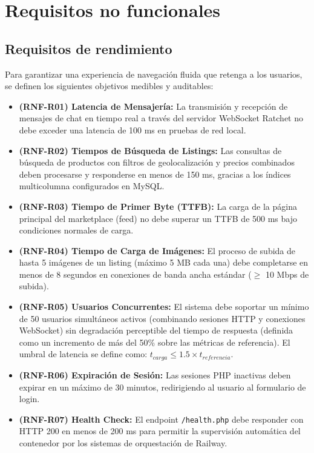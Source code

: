 \documentclass[11pt,a4paper]{report}
\begin{document}
\newpage
\section{Requisitos no funcionales}

\subsection{Requisitos de rendimiento}
Para garantizar una experiencia de navegación fluida que retenga a los usuarios, se definen los siguientes objetivos medibles y auditables:
\begin{itemize}
    \item \textbf{(RNF-R01) Latencia de Mensajería:} La transmisión y recepción de mensajes de chat en tiempo real a través del servidor WebSocket Ratchet no debe exceder una latencia de 100 ms en pruebas de red local.
    \item \textbf{(RNF-R02) Tiempos de Búsqueda de Listings:} Las consultas de búsqueda de productos con filtros de geolocalización y precios combinados deben procesarse y responderse en menos de 150 ms, gracias a los índices multicolumna configurados en MySQL.
    \item \textbf{(RNF-R03) Tiempo de Primer Byte (TTFB):} La carga de la página principal del marketplace (feed) no debe superar un TTFB de 500 ms bajo condiciones normales de carga.
    \item \textbf{(RNF-R04) Tiempo de Carga de Imágenes:} El proceso de subida de hasta 5 imágenes de un listing (máximo 5 MB cada una) debe completarse en menos de 8 segundos en conexiones de banda ancha estándar ($\geq$ 10 Mbps de subida).
    \item \textbf{(RNF-R05) Usuarios Concurrentes:} El sistema debe soportar un mínimo de 50 usuarios simultáneos activos (combinando sesiones HTTP y conexiones WebSocket) sin degradación perceptible del tiempo de respuesta (definida como un incremento de más del 50\% sobre las métricas de referencia). El umbral de latencia se define como: $t_{carga} \leq 1.5 \times t_{referencia}$.
    \item \textbf{(RNF-R06) Expiración de Sesión:} Las sesiones PHP inactivas deben expirar en un máximo de 30 minutos, redirigiendo al usuario al formulario de login.
    \item \textbf{(RNF-R07) Health Check:} El endpoint \texttt{/health.php} debe responder con HTTP 200 en menos de 200 ms para permitir la supervisión automática del contenedor por los sistemas de orquestación de Railway.
\end{itemize}
\end{document}
